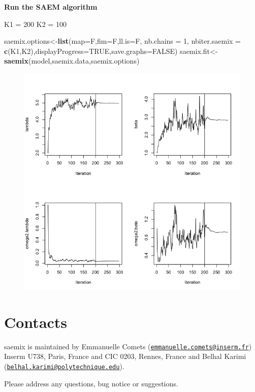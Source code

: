 \documentclass[]{book}
\newenvironment{Shaded}{\begin{snugshade}}{\end{snugshade}}
\newcommand{\KeywordTok}[1]{\textcolor[rgb]{0.13,0.29,0.53}{\textbf{{#1}}}}
\newcommand{\DataTypeTok}[1]{\textcolor[rgb]{0.13,0.29,0.53}{{#1}}}
\newcommand{\DecValTok}[1]{\textcolor[rgb]{0.00,0.00,0.81}{{#1}}}
\newcommand{\StringTok}[1]{\textcolor[rgb]{0.31,0.60,0.02}{{#1}}}
\newcommand{\OtherTok}[1]{\textcolor[rgb]{0.56,0.35,0.01}{{#1}}}
\newcommand{\NormalTok}[1]{{#1}}
\begin{document}
\textbf{Run the SAEM algorithm}

\begin{Shaded}
\begin{Highlighting}[]
\NormalTok{K1 =}\StringTok{ }\DecValTok{200}
\NormalTok{K2 =}\StringTok{ }\DecValTok{100}

\NormalTok{saemix.options<-}\KeywordTok{list}\NormalTok{(}\DataTypeTok{map=}\NormalTok{F,}\DataTypeTok{fim=}\NormalTok{F,}\DataTypeTok{ll.is=}\NormalTok{F, }\DataTypeTok{nb.chains =} \DecValTok{1}\NormalTok{, }
  \DataTypeTok{nbiter.saemix =} \KeywordTok{c}\NormalTok{(K1,K2),}\DataTypeTok{displayProgress=}\OtherTok{TRUE}\NormalTok{,}\DataTypeTok{save.graphs=}\OtherTok{FALSE}\NormalTok{)}
\NormalTok{saemix.fit<-}\KeywordTok{saemix}\NormalTok{(model,saemix.data,saemix.options)}
\end{Highlighting}
\end{Shaded}

\begin{figure}

{\centering \includegraphics[width=1\linewidth]{figures/popparam_tte} 

}

\end{figure}

\chapter*{Contacts}\label{contacts}

saemix is maintained by Emmanuelle Comets
(\href{mailto:emmanuelle.comets@inserm.fr}{\nolinkurl{emmanuelle.comets@inserm.fr}})
Inserm U738, Paris, France and CIC 0203, Rennes, France and Belhal
Karimi
(\href{mailto:belhal.karimi@polytechnique.edu}{\nolinkurl{belhal.karimi@polytechnique.edu}}).

Please address any questions, bug notice or suggestions.


\end{document}
